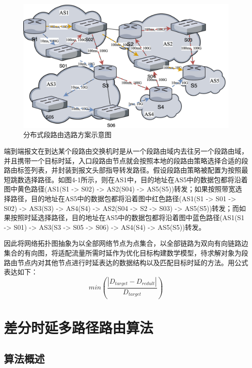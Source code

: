 \begin{figure}[htbp]
\setlength{\abovecaptionskip}{15pt plus 3pt minus 2pt}
\centerline{\includegraphics[width=1\textwidth]{./figures/ch4-problem-model.png}}
\caption{分布式段路由选路方案示意图}
\label{fig-ch4-problem-model}
\end{figure}    

端到端报文在到达某个段路由交换机时是从一个段路由域内去往另一个段路由域，并且携带一个目标时延，入口段路由节点就会按照本地的段路由策略选择合适的段路由标签列表，并封装到报文头部指导转发路径。假设段路由策略被配置为按照最短跳数选择路径。如图4-1所示，则在AS1中，目的地址在AS5中的数据包都将沿着图中黄色路径(AS1(S1 -> S02) -> AS2(S04) -> AS5(S5))转发；如果按照带宽选择路径，目的地址在AS5中的数据包都将沿着图中红色路径(AS1(S1 -> S01 -> S02) -> AS3(S3) -> AS4(S4) -> AS2(S04 -> S2 -> S03) -> AS5(S5))转发；而如果按照时延选择路径，目的地址在AS5中的数据包都将沿着图中蓝色路径(AS1(S1 -> S01) -> AS3(S3 -> S05 -> S06) -> AS4(S4) -> AS5(S5))转发。

因此将网络拓扑图抽象为以全部网络节点为点集合，以全部链路为双向有向链路边集合的有向图，将适配流量所需时延作为优化目标构建数学模型，待求解对象为段路由节点内对其他节点进行时延表达的数据结构以及匹配目标时延的方法。用公式表达如下：
$$min(\frac{|D_{target}-D_{redult}|}{D_{target}})$$

\section{差分时延多路径路由算法}

\subsection{算法概述}

